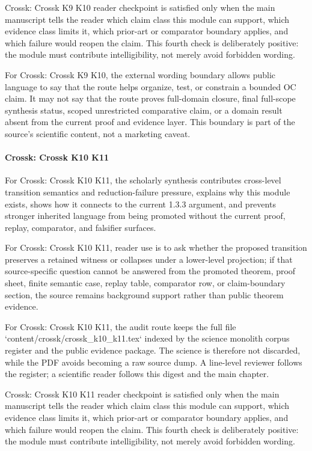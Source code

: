 Crossk: Crossk K9 K10 reader checkpoint is satisfied only when the main manuscript tells the reader which claim class this module can support, which evidence class limits it, which prior-art or comparator boundary applies, and which failure would reopen the claim. This fourth check is deliberately positive: the module must contribute intelligibility, not merely avoid forbidden wording.


For Crossk: Crossk K9 K10, the external wording boundary allows public language to say that the route helps organize, test, or constrain a bounded OC claim. It may not say that the route proves full-domain closure, final full-scope synthesis status, scoped unrestricted comparative claim, or a domain result absent from the current proof and evidence layer. This boundary is part of the source's scientific content, not a marketing caveat.


\paragraph{Crossk: Crossk K10 K11}

For Crossk: Crossk K10 K11, the scholarly synthesis contributes cross-level transition semantics and reduction-failure pressure, explains why this module exists, shows how it connects to the current 1.3.3 argument, and prevents stronger inherited language from being promoted without the current proof, replay, comparator, and falsifier surfaces.


For Crossk: Crossk K10 K11, reader use is to ask whether the proposed transition preserves a retained witness or collapses under a lower-level projection; if that source-specific question cannot be answered from the promoted theorem, proof sheet, finite semantic case, replay table, comparator row, or claim-boundary section, the source remains background support rather than public theorem evidence.


For Crossk: Crossk K10 K11, the audit route keeps the full file `content/crossk/crossk\_k10\_k11.tex` indexed by the science monolith corpus register and the public evidence package. The science is therefore not discarded, while the PDF avoids becoming a raw source dump. A line-level reviewer follows the register; a scientific reader follows this digest and the main chapter.


Crossk: Crossk K10 K11 reader checkpoint is satisfied only when the main manuscript tells the reader which claim class this module can support, which evidence class limits it, which prior-art or comparator boundary applies, and which failure would reopen the claim. This fourth check is deliberately positive: the module must contribute intelligibility, not merely avoid forbidden wording.


